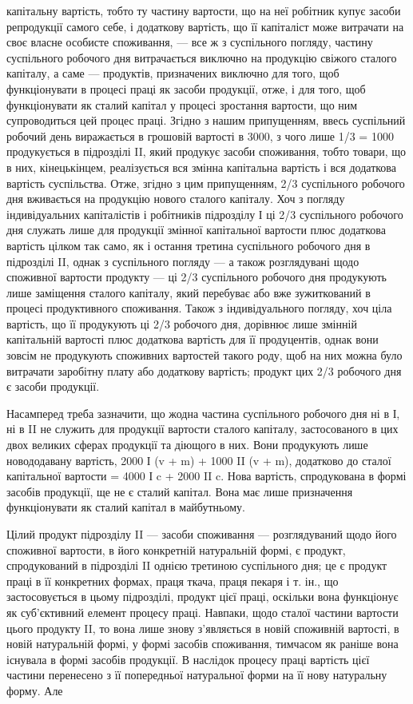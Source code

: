\parcont{}  %
капітальну вартість, тобто ту частину вартости, що на неї робітник купує
засоби репродукції самого себе, і додаткову вартість, що її капіталіст
може витрачати на своє власне особисте споживання, — все ж з суспільного
погляду, частину суспільного робочого дня витрачається виключно на
продукцію свіжого сталого капіталу, а саме — продуктів, призначених
виключно для того, щоб функціонувати в процесі праці як засоби
продукції, отже, і для того, щоб функціонувати як сталий капітал у
процесі зростання вартости, що ним супроводиться цей процес праці.
Згідно з нашим припущенням, ввесь суспільний робочий день виражається в
грошовій вартості в 3000, з чого лише 1/3 = 1000 продукується в підрозділі
II, який продукує засоби споживання, тобто товари, що в них, кінецькінцем,
реалізується вся змінна капітальна вартість і вся додаткова вартість
суспільства. Отже, згідно з цим припущенням, 2/3 суспільного робочого
дня вживається на продукцію нового сталого капіталу. Хоч з погляду
індивідуальних капіталістів і робітників підрозділу І ці 2/3 суспільного
робочого дня служать лише для продукції змінної капітальної вартости
плюс додаткова вартість цілком так само, як і остання третина суспільного
робочого дня в підрозділі II, однак з суспільного погляду — а
також розглядувані щодо споживної вартости продукту — ці 2/3 суспільного
робочого дня продукують лише заміщення сталого капіталу, який
перебуває або вже зужиткований в процесі продуктивного споживання.
Також з індивідуального погляду, хоч ціла вартість, що її продукують ці
2/3 робочого дня, дорівнює лише змінній капітальній вартості плюс додаткова
вартість для її продуцентів, однак вони зовсім не продукують
споживних вартостей такого роду, щоб на них можна було витрачати
заробітну плату або додаткову вартість; продукт цих 2/3 робочого дня є
засоби продукції.

Насамперед треба зазначити, що жодна частина суспільного робочого
дня ні в І, ні в II не служить для продукції вартости сталого капіталу,
застосованого в цих двох великих сферах продукції та діющого в них.
Вони продукують лише новододавану вартість, 2000 І (v + m) + 1000
II (v + m), додатково до сталої капітальної вартости = 4000 І c + 2000
II c. Нова вартість, спродукована в формі засобів продукції, ще не є
сталий капітал. Вона має лише призначення функціонувати як сталий
капітал в майбутньому.

Цілий продукт підрозділу II — засоби споживання — розглядуваний щодо
його споживної вартости, в його конкретній натуральній формі, є продукт,
спродукований в підрозділі II однією третиною суспільного дня;
це є продукт праці в її конкретних формах, праця ткача, праця пекаря
і т. ін., що застосовується в цьому підрозділі, продукт цієї праці, оскільки
вона функціонує як суб’єктивний елемент процесу праці. Навпаки,
щодо сталої частини вартости цього продукту II, то вона лише знову
з’являється в новій споживній вартості, в новій натуральній формі, у
формі засобів споживання, тимчасом як раніше вона існувала в формі засобів
продукції. В наслідок процесу праці вартість цієї частини перенесено
з її попередньої натуральної форми на її нову натуральну форму. Але
\parbreak{}  %
